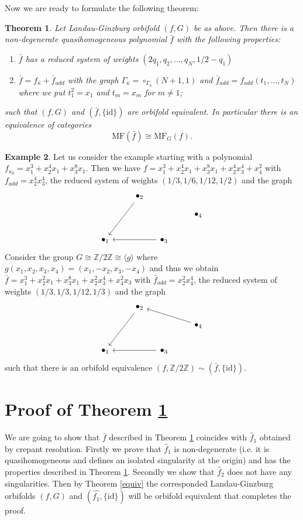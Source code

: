 \documentclass[reqno,12pt]{amsart}
\numberwithin{equation}{section}
\theoremstyle{plain}
\newtheorem{theorem}{Theorem}
\theoremstyle{definition}
\newtheorem{example}[theorem]{Example}
\newcommand{\ZZ}{{\mathbb{Z}}}
\newcommand{\id}{\mathrm{id}}
\begin{document}
Now we are ready to formulate the following theorem:
\begin{theorem}\label{main}
    Let Landau-Ginzburg orbifold $(f,G)$ be as above. Then there is a non-degenerate quasihomogeneous polynomial $\bar{f}$ with the following properties:
    \begin{enumerate}
        \item $\bar{f}$ has a reduced system of weights $(2q_1, q_2, \dots, q_N, 1/2 - q_1)$
        \item  $ \bar{f} = f_{\bar{\kappa}} + \bar{f}_{add}$ with the graph $\Gamma_{\bar{\kappa}} = \circ_{\Gamma_\kappa}(N+1, 1)$ and $\bar{f}_{add}= f_{add}(t_1, \dots, t_N)$ where we put $t_1^2 = x_1$ and $t_m=x_m$ for $m \neq 1$;
    \end{enumerate}
such that $(f, G)$ and $(\bar{f}, \{\id\})$ are orbifold equivalent. In particular there is an equivalence of categories
$$\mathrm{MF}(\bar{f}) \cong\mathrm{MF}_G(f).$$
\end{theorem}
\begin{example}
    Let us consider the example starting with a polynomial $f_{\kappa_0} = x_1^3 + x_2^4x_1 + x_3^8x_1$. Then we have $f = x_1^3 + x_2^4x_1 + x_3^8x_1+x_2^4x_3^4 + x_4^2$ with $f_{add} = x_2^4x_3^4$, the reduced system of weights $(1/3,1/6,1/12,1/2)$ and the graph
\[\begin{tikzcd}[sep=small]
	&& {\bullet_2} \\
	&&&&& {\bullet_4} \\
	\\
	{\bullet_1} &&& {\bullet_3}
	\arrow[from=1-3, to=4-1]
	\arrow[from=4-4, to=4-1]
\end{tikzcd}\]
Consider the group $G \cong \ZZ/2\ZZ \cong \langle g \rangle$ where $g(x_1,x_2,x_3,x_4) =(x_1,-x_2, x_3, -x_4)$ and thus we obtain $\bar{f} = x_1^3 + x_2^2x_1 + x_3^8x_1+x_2^2x_3^4 +x_4^2x_3$ with $\bar{f}_{add} =x_2^2x_4^4$, the reduced system of weights $(1/3,1/3,1/12,1/3)$ and the graph 
\[\begin{tikzcd}[sep=small]
	&& {\bullet_2} \\
	&&&&& {\bullet_4} \\
	\\
	{\bullet_1} &&& {\bullet_3}
	\arrow[from=1-3, to=4-1]
	\arrow[from=4-4, to=4-1]
	\arrow[from=2-6, to=1-3]
\end{tikzcd}\]
such that there is an orbifold equivalence $(f, \ZZ/2\ZZ) \sim (\bar{f}, \{\id\})$.
\end{example}
\section{Proof of Theorem \ref{main}}
We are going to show that $\bar{f}$ described in Theorem \ref{main} coincides with $\hat{f}_1$ obtained by crepant resolution. Firstly we prove that $\hat{f}_1$ is non-degenerate (i.e. it is quasihomogeneous and defines an isolated singularity at the origin) and has the properties described in Theorem \ref{main}. Secondly we show that $\hat{f}_2$ does not have any singularities. Then by Theorem \ref{equiv} the corresponded Landau-Ginzburg orbifolds $(f,G)$ and $(\hat{f_1}, \{\id\})$ will be orbifold equivalent that completes the proof. 
\end{document}
